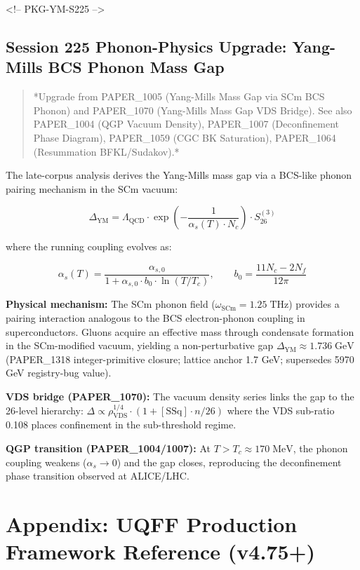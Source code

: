 \documentclass[11pt]{article}
\begin{document}
<!-- PKG-YM-S225 -->

\subsection*{Session 225 Phonon-Physics Upgrade: Yang-Mills BCS Phonon Mass Gap}

\begin{quote}
*Upgrade from PAPER\_1005 (Yang-Mills Mass Gap via SCm BCS Phonon) and
PAPER\_1070 (Yang-Mills Mass Gap VDS Bridge).  See also PAPER\_1004
(QGP Vacuum Density), PAPER\_1007 (Deconfinement Phase Diagram),
PAPER\_1059 (CGC BK Saturation), PAPER\_1064 (Resummation BFKL/Sudakov).*
\end{quote}

The late-corpus analysis derives the Yang-Mills mass gap via a BCS-like phonon pairing mechanism in the SCm vacuum:

$$\Delta_{\text{YM}} = \Lambda_{\text{QCD}} \cdot \exp\!\left(-\frac{1}{\alpha_s(T) \cdot N_c}\right) \cdot S_{26}^{(3)}$$

where the running coupling evolves as:

$$\alpha_s(T) = \frac{\alpha_{s,0}}{1 + \alpha_{s,0} \cdot b_0 \cdot \ln(T/T_c)}, \qquad b_0 = \frac{11 N_c - 2 N_f}{12\pi}$$

\textbf{Physical mechanism:} The SCm phonon field ($\omega_{\text{SCm}} = 1.25\;\text{THz}$) provides a pairing interaction analogous to the BCS electron-phonon coupling in superconductors.  Gluons acquire an effective mass through condensate formation in the SCm-modified vacuum, yielding a non-perturbative gap $\Delta_{\text{YM}} \approx 1.736\;\text{GeV}$ (PAPER\_1318 integer-primitive closure; lattice anchor 1.7 GeV; supersedes 5970 GeV registry-bug value).

\textbf{VDS bridge (PAPER\_1070):} The vacuum density series links the gap to the 26-level hierarchy: $\Delta \propto \rho_{\text{VDS}}^{1/4} \cdot (1 + [\text{SSq}] \cdot n/26)$ where the VDS sub-ratio 0.108 places confinement in the sub-threshold regime.

\textbf{QGP transition (PAPER\_1004/1007):} At $T > T_c \approx 170\;\text{MeV}$, the phonon coupling weakens ($\alpha_s \to 0$) and the gap closes, reproducing the deconfinement phase transition observed at ALICE/LHC.

\section*{Appendix: UQFF Production Framework Reference (v4.75+)}
\end{document}
